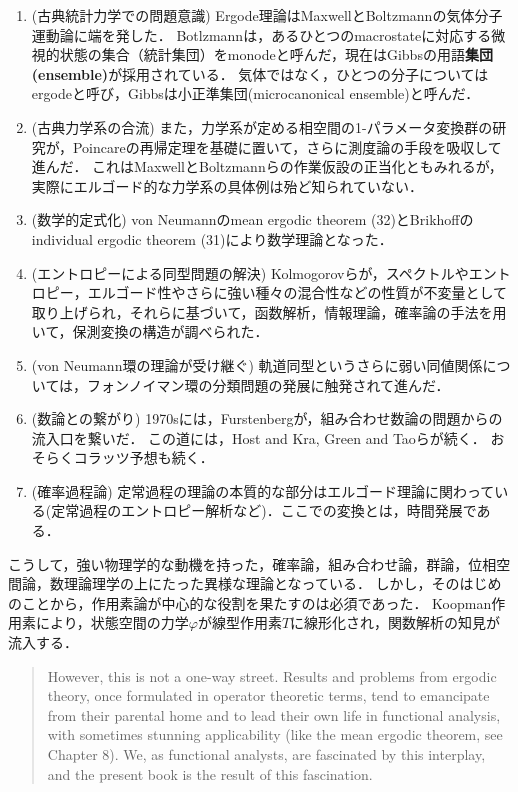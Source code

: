 \documentclass[uplatex,dvipdfmx]{jsreport}
\begin{document}
\begin{enumerate}
    \item (古典統計力学での問題意識) Ergode理論はMaxwellとBoltzmannの気体分子運動論に端を発した．
    Botlzmannは，あるひとつのmacrostateに対応する微視的状態の集合（統計集団）をmonodeと呼んだ，現在はGibbsの用語\textbf{集団(ensemble)}が採用されている．
    気体ではなく，ひとつの分子についてはergodeと呼び，Gibbsは小正準集団(microcanonical ensemble)と呼んだ．
    \item (古典力学系の合流) また，力学系が定める相空間の1-パラメータ変換群の研究が，Poincareの再帰定理を基礎に置いて，さらに測度論の手段を吸収して進んだ．
    これはMaxwellとBoltzmannらの作業仮設の正当化ともみれるが，実際にエルゴード的な力学系の具体例は殆ど知られていない．
    \item (数学的定式化) von Neumannのmean ergodic theorem (32)とBrikhoffのindividual ergodic theorem (31)により数学理論となった．
    \item (エントロピーによる同型問題の解決) Kolmogorovらが，スペクトルやエントロピー，エルゴード性やさらに強い種々の混合性などの性質が不変量として取り上げられ，それらに基づいて，函数解析，情報理論，確率論の手法を用いて，保測変換の構造が調べられた．
    \item (von Neumann環の理論が受け継ぐ) 軌道同型というさらに弱い同値関係については，フォンノイマン環の分類問題の発展に触発されて進んだ．
    \item (数論との繋がり) 1970sには，Furstenbergが，組み合わせ数論の問題からの流入口を繋いだ．
    この道には，Host and Kra, Green and Taoらが続く．
    おそらくコラッツ予想も続く．
    \item (確率過程論) 定常過程の理論の本質的な部分はエルゴード理論に関わっている(定常過程のエントロピー解析など)．ここでの変換とは，時間発展である．
\end{enumerate}

\begin{remarks}[作用素論的定式化]
    こうして，強い物理学的な動機を持った，確率論，組み合わせ論，群論，位相空間論，数理論理学の上にたった異様な理論となっている．
しかし，そのはじめのことから，作用素論が中心的な役割を果たすのは必須であった．
Koopman作用素により，状態空間の力学$\varphi$が線型作用素$T$に線形化され，関数解析の知見が流入する．

\begin{quote}
    However, this is not a one-way street. Results and problems from ergodic theory,
once formulated in operator theoretic terms, tend to emancipate from their parental
home and to lead their own life in functional analysis, with sometimes stunning
applicability (like the mean ergodic theorem, see Chapter 8). We, as functional
analysts, are fascinated by this interplay, and the present book is the result of this
fascination.\cite{OperatorTheoretic}
\end{quote}
\end{remarks}
\end{document}
